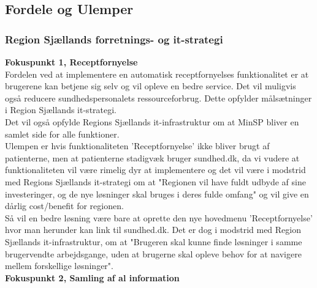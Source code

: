 %
%
%
\subsection{Fordele og Ulemper}
\subsubsection{Region Sjællands forretnings- og it-strategi}
\textbf{Fokuspunkt 1, Receptfornyelse}\\
Fordelen ved at implementere en automatisk receptfornyelses funktionalitet er at brugerene kan betjene sig selv og vil opleve en bedre service. Det vil muligvis også reducere sundhedspersonalets ressourceforbrug. Dette opfylder målsætninger i Region Sjællands it-strategi.\\
Det vil også opfylde Regions Sjællands it-infrastruktur om at MinSP bliver en samlet side for alle funktioner.\\
Ulempen er hvis funktionaliteten 'Receptfornyelse' ikke bliver brugt af patienterne, men at patienterne stadigvæk bruger sundhed.dk, da vi vudere at funktionaliteten vil være rimelig dyr at implementere og det vil være i modstrid med Regions Sjællands it-strategi om at "Regionen vil have fuldt udbyde af sine investeringer, og de nye løsninger skal bruges i deres fulde omfang" og vil give en dårlig cost/benefit for regionen.\\ 
Så vil en bedre løsning være bare at oprette den nye hovedmenu  'Receptfornyelse' hvor man herunder kan link til sundhed.dk. Det er dog i modstrid med Region Sjællands it-infrastruktur, om at "Brugeren skal kunne finde løsninger i samme brugervendte arbejdsgange, uden at brugerne skal opleve behov for at navigere mellem forskellige løsninger". \\
\textbf{Fokuspunkt 2, Samling af al information}
